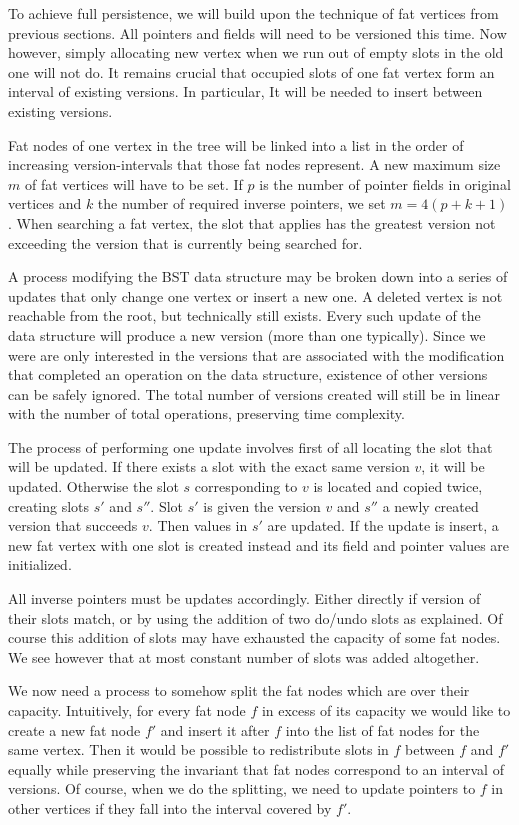 To achieve full persistence, we will build upon the technique of fat vertices from previous sections. All pointers and fields will need to be versioned this time. Now however, simply allocating new vertex when we run out of empty slots in the old one will not do. It remains crucial that occupied slots of one fat vertex form an interval of existing versions. In particular, It will be needed to insert between existing versions.

Fat nodes of one vertex in the tree will be linked into a list in the order of increasing version-intervals that those fat nodes represent. A new maximum size $m$ of fat vertices will have to be set. If $p$ is the number of pointer fields in original vertices and $k$ the number of required inverse pointers, we set $m = 4(p+k+1)$.
When searching a fat vertex, the slot that applies has the greatest version not exceeding the version that is currently being searched for.

A process modifying the BST data structure may be broken down into a series of updates that only change one vertex or insert a new one. A deleted vertex is not reachable from the root, but technically still exists.
Every such update of the data structure will produce a new version (more than one typically). Since we were are only interested in the versions that are associated with the modification that completed an operation on the data structure, existence of other versions can be safely ignored. The total number of versions created will still be in linear with the number of total operations, preserving time complexity.

The process of performing one update involves first of all locating the slot that will be updated. If there exists a slot with the exact same version $v$, it will be updated. Otherwise the slot $s$ corresponding to $v$ is located and copied twice, creating slots $s'$ and $s''$. Slot $s'$ is given the version $v$ and $s''$ a newly created version that succeeds $v$. Then values in $s'$ are updated.
If the update is insert, a new fat vertex with one slot is created instead and its field and pointer values are initialized.

All inverse pointers must be updates accordingly. Either directly if version of their slots match, or by using the addition of two do/undo slots as explained. Of course this addition of slots may have exhausted the capacity of some fat nodes. We see however that at most constant number of slots was added altogether. 

We now need a process to somehow split the fat nodes which are over their capacity. Intuitively, for every fat node $f$ in excess of its capacity we would like to create a new fat node $f'$ and insert it after $f$ into the list of fat nodes for the same vertex. Then it would be possible to redistribute slots in $f$ between $f$ and $f'$ equally while preserving the invariant that fat nodes correspond to an interval of versions. Of course, when we do the splitting, we need to update pointers to $f$ in other vertices if they fall into the interval covered by $f'$.


